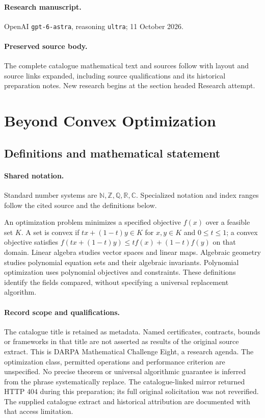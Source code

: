 \documentclass[11pt]{article}
\begin{document}
\paragraph{Research manuscript.} OpenAI \texttt{gpt-6-astra}, reasoning \texttt{ultra}; 11 October 2026.
\paragraph{Preserved source body.} The complete catalogue mathematical text and sources follow with layout and source links expanded, including source qualifications and its historical preparation notes. New research begins at the section headed Research attempt.

\section{Beyond Convex Optimization}\label{statement}

\subsection{Definitions and mathematical statement}

\paragraph{Shared notation.}Standard number systems are $\mathbb N,\mathbb Z,\mathbb Q,\mathbb R,\mathbb C$. Specialized notation and index ranges follow the cited source and the definitions below.


An optimization problem minimizes a specified objective $f(x)$ over a feasible set $K$. A set is convex if $tx+(1-t)y\in K$ for $x,y\in K$ and $0\leq t\leq1$; a convex objective satisfies $f(tx+(1-t)y)\leq tf(x)+(1-t)f(y)$ on that domain. Linear algebra studies vector spaces and linear maps. Algebraic geometry studies polynomial equation sets and their algebraic invariants. Polynomial optimization uses polynomial objectives and constraints. These definitions identify the fields compared, without specifying a universal replacement algorithm.
\paragraph{Record scope and qualifications.}
The catalogue title is retained as metadata. Named certificates, contracts, bounds or frameworks in that title are not asserted as results of the original source extract.
This is DARPA Mathematical Challenge Eight, a research agenda. The optimization class, permitted operations and performance criterion are unspecified. No precise theorem or universal algorithmic guarantee is inferred from the phrase systematically replace. The catalogue-linked mirror returned HTTP 404 during this preparation; its full original solicitation was not reverified. The supplied catalogue extract and historical attribution are documented with that access limitation.
\end{document}
